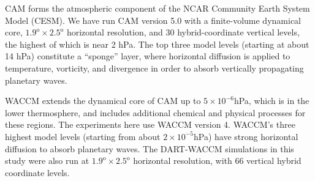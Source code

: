 CAM \citep{nealeetal2010} forms the atmospheric component of the NCAR Community Earth System Model (CESM). 
We have run CAM version 5.0 with a finite-volume dynamical core, $1.9^{\text{o}} \times 2.5^{\text{o}}$ horizontal resolution, and  30 hybrid-coordinate vertical levels, the highest of which is near 2 hPa.
The top three model levels (starting at about 14 hPa) constitute a ``sponge'' layer, where horizontal diffusion is applied to temperature, vorticity, and divergence in order to absorb vertically propagating planetary waves.  

WACCM \citep{Marsh2013} extends the dynamical core of CAM up to $5 \times 10^{-6}$hPa, which is in the lower thermosphere, and includes additional chemical and physical processes for these regions. 
The experiments here use WACCM version 4.
WACCM's three highest model levels (starting from about $2 \times 10^{-5}$hPa) have strong horizontal diffusion to absorb planetary waves. 
The DART-WACCM simulations in this study were also run at $1.9^{\text{o}} \times 2.5^{\text{o}}$ horizontal resolution, with 66 vertical hybrid coordinate levels. 

